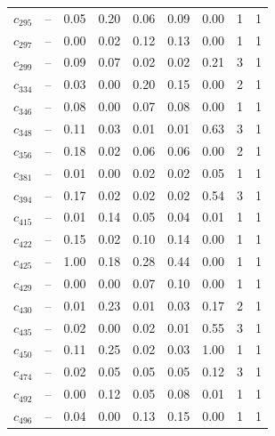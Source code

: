 \begin{tabular}{lcccccccc}
$c_{295}$ & -- & 0.05 & 0.20 & 0.06 & 0.09 & 0.00 & 1 & 1 \\
$c_{297}$ & -- & 0.00 & 0.02 & 0.12 & 0.13 & 0.00 & 1 & 1 \\
$c_{299}$ & -- & 0.09 & 0.07 & 0.02 & 0.02 & 0.21 & 3 & 1 \\
$c_{334}$ & -- & 0.03 & 0.00 & 0.20 & 0.15 & 0.00 & 2 & 1 \\
$c_{346}$ & -- & 0.08 & 0.00 & 0.07 & 0.08 & 0.00 & 1 & 1 \\
$c_{348}$ & -- & 0.11 & 0.03 & 0.01 & 0.01 & 0.63 & 3 & 1 \\
$c_{356}$ & -- & 0.18 & 0.02 & 0.06 & 0.06 & 0.00 & 2 & 1 \\
$c_{381}$ & -- & 0.01 & 0.00 & 0.02 & 0.02 & 0.05 & 1 & 1 \\
$c_{394}$ & -- & 0.17 & 0.02 & 0.02 & 0.02 & 0.54 & 3 & 1 \\
$c_{415}$ & -- & 0.01 & 0.14 & 0.05 & 0.04 & 0.01 & 1 & 1 \\
$c_{422}$ & -- & 0.15 & 0.02 & 0.10 & 0.14 & 0.00 & 1 & 1 \\
$c_{425}$ & -- & 1.00 & 0.18 & 0.28 & 0.44 & 0.00 & 1 & 1 \\
$c_{429}$ & -- & 0.00 & 0.00 & 0.07 & 0.10 & 0.00 & 1 & 1 \\
$c_{430}$ & -- & 0.01 & 0.23 & 0.01 & 0.03 & 0.17 & 2 & 1 \\
$c_{435}$ & -- & 0.02 & 0.00 & 0.02 & 0.01 & 0.55 & 3 & 1 \\
$c_{450}$ & -- & 0.11 & 0.25 & 0.02 & 0.03 & 1.00 & 1 & 1 \\
$c_{474}$ & -- & 0.02 & 0.05 & 0.05 & 0.05 & 0.12 & 3 & 1 \\
$c_{492}$ & -- & 0.00 & 0.12 & 0.05 & 0.08 & 0.01 & 1 & 1 \\
$c_{496}$ & -- & 0.04 & 0.00 & 0.13 & 0.15 & 0.00 & 1 & 1 \\
\bottomrule
\end{tabular}